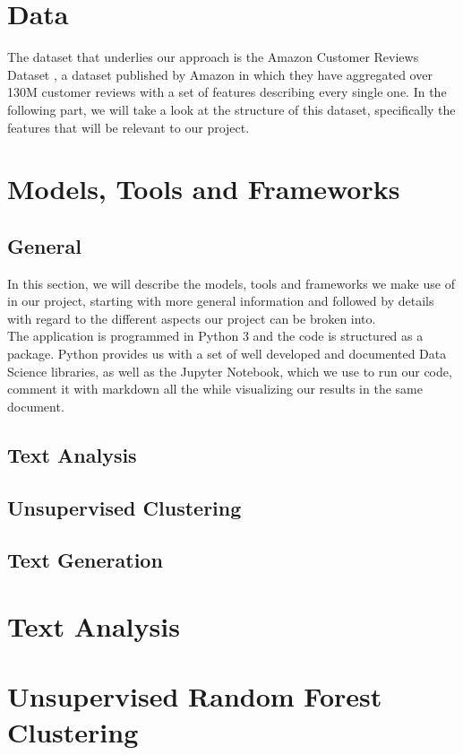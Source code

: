 \documentclass[]{report}
\begin{document}
\chapter{Data}
The dataset that underlies our approach is the Amazon Customer Reviews Dataset \cite{amazondataset}, a dataset published by Amazon in which they have aggregated over 130M customer reviews with a set of features describing every single one. In the following part, we will take a look at the structure of this dataset, specifically the features that will be relevant to our project.

\chapter{Models, Tools and Frameworks}
\section{General}
In this section, we will describe the models, tools and frameworks we make use of in our project, starting with more general information and followed by details with regard to the different aspects our project can be broken into.\\

The application is programmed in Python 3 and the code is structured as a package. Python provides us with a set of well developed and documented Data Science libraries, as well as the Jupyter Notebook, which we use to run our code, comment it with markdown all the while visualizing our results in the same document.

\section{Text Analysis}

\section{Unsupervised Clustering}

\section{Text Generation}


\chapter{Text Analysis}

\chapter{Unsupervised Random Forest Clustering}
\end{document}

